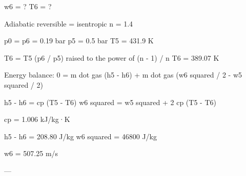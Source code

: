 w6 = ?  
T6 = ?  

Adiabatic reversible = isentropic  
n = 1.4  

p0 = p6 = 0.19 bar  
p5 = 0.5 bar  
T5 = 431.9 K  

T6 = T5 (p6 / p5) raised to the power of (n - 1) / n  
T6 = 389.07 K  

Energy balance:  
0 = m dot gas (h5 - h6) + m dot gas (w6 squared / 2 - w5 squared / 2)  

h5 - h6 = cp (T5 - T6)  
w6 squared = w5 squared + 2 cp (T5 - T6)  

cp = 1.006 kJ/kg·K  

h5 - h6 = 208.80 J/kg  
w6 squared = 46800 J/kg  

w6 = 507.25 m/s  

---